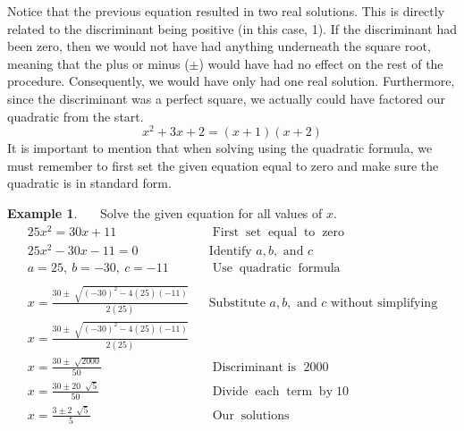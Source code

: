 \documentclass[12pt]{book}
\theoremstyle{definition}
\newtheorem{example}{Example}
\newcommand{\tmop}[1]{\ensuremath{\operatorname{#1}}}
\begin{document}
Notice that the previous equation resulted in two real solutions.  This is directly related to the discriminant being positive (in this case, 1).  If the discriminant had been zero, then we would not have had anything underneath the square root, meaning that the plus or minus ($\pm$) would have had no effect on the rest of the procedure.  Consequently, we would have only had one real solution.  Furthermore, since the discriminant was a perfect square, we actually could have factored our quadratic from the start.
$$x^2+3x+2=(x+1)(x+2)$$
It is important to mention that when solving using the quadratic formula, we must remember to first set the given equation equal to zero and make sure the quadratic is in standard form.
\begin{example}~~~Solve the given equation for all values of $x$.
\begin{eqnarray*}
   25 x^2 = 30 x + 11 &  & \tmop{First} \tmop{set} \tmop{equal} \tmop{to} \tmop{zero}\\
   25 x^2 - 30 x - 11 = 0 &  & \text{Identify~} a,b, \text{~and~}c\\
   a = 25,~ b = -30,~ c = -11 & & \tmop{Use} \tmop{quadratic} \tmop{formula}\\ 
   & & \\
   x = \frac{30 \pm \sqrt[]{(- 30)^2 - 4 (25) (- 11)}}{2 (25)} &  & \text{Substitute~} a,b, \text{~and~} c \text{~without~simplifying}\\
   x = \frac{30 \pm \sqrt[]{(- 30)^2 - 4 (25) (- 11)}}{2 (25)} &  & \\
   x = \frac{30 \pm \sqrt[]{2000}}{50} &  & \tmop{Discriminant~is~} 2000\\
   x = \frac{30 \pm 20~ \sqrt[]{5}}{50} &  & \tmop{Divide} \tmop{each} \tmop{term} \tmop{by} 10\\
   x = \frac{3 \pm 2~ \sqrt[]{5}}{5} &  & \tmop{Our} \tmop{solutions}
\end{eqnarray*}
\end{example}
\end{document}
